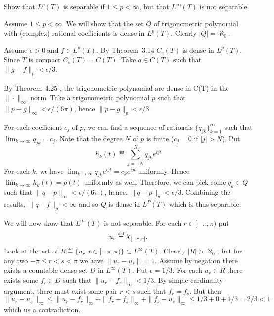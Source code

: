 \begin{enumerate}
\begin{excopy}
Show that \(L^p(T)\) is separable if \(1\leq p < \infty\),
but that \(L^\infty(T)\) is not separable.
\end{excopy}

Assume \(1\leq p < \infty\).
We will show that the set $Q$ of trigonometric polynomial
with (complex) rational coefficients is dense in \(L^p(T)\).
Clearly \(|Q| = \aleph_0\).

Assume \(\epsilon > 0\) and \(f\in L^p(T)\).
By Theorem~3.14 \cite{RudinRCA80} \(C_c(T)\) is dense in \(L^p(T)\).
Since $T$ is compact \(C_c(T)=C(T)\).
Take \(g\in C(T)\) such that \(\|g - f\|_p < \epsilon/3\).

By Theorem~4.25 \cite{RudinRCA80}, the trigonometric polynomial
are dense in C(T) in the \(\|\cdot\|_\infty\) norm.
Take a trigonometric polynomial $p$ such that
\(\|p - g\|_\infty < \epsilon/(6\pi)\), hence
\(\|p - g\|_p < \epsilon/3\).

For each coefficient \(c_j\) of $p$, we can find a sequence of
rationals \(\{q_{jk}\}_{k=1}^\infty\)
such that \(\lim_{k\to\infty} q_{jk} = c_j\).
Note that  the degree $N$ of $p$ is finite (\(c_j = 0\) if \(|j| > N\)).
Put
\begin{equation*}
h_k(t) \eqdef \sum_{j=-N}^N q_{jk} e^{ijt}
\end{equation*}
For each $k$,
we have \(\lim_{k\to\infty} q_{jk} e^{ijt} = c_k e^{ijt}\) uniformly.
Hence  \(\lim_{k\to\infty} h_k(t) = p(t)\) uniformly as well.
Therefore, we can pick some \(q_k \in Q\) such that
\(\|q - p\|_\infty < \epsilon/(6\pi)\), hence.
\(\|q - p\|_p < \epsilon/3\).
Combining the results, \(\|q - f\|_p < \infty\)
and so $Q$ is dense in \(L^P(T)\) which is thus separable.

We will now show that  \(L^\infty(T)\) is not separable.
For each \(r\in[-\pi,\pi)\) put
\begin{equation*}
 u_r \eqdef\chhi_{[-\pi,r]}.
\end{equation*}
Look at the set of \(R \eqdef \{u_r:  r\in[-\pi,\pi)\} \subset L^\infty(T)\).
Clearly \(|R| > \aleph_0\), but
for any two \(-\pi \leq r < s < \pi\) we have \(\|u_r - u_s\| = 1\).
Assume by negation there exists a countable dense set $D$ in \(L^\infty(T)\).
Put \(\epsilon = 1/3\). For each \(u_r\in R\) there exists some \(f_r\in D\)
such that \(\|u_r - f_r\|_\infty < 1/3\). By simple cardinality argument,
there must exist some pair \(r<s\) such that \(f_r = f_s\).
But then
\begin{equation*}
 \|u_r - u_s\|_\infty
 \leq \|u_r - f_r\|_\infty + \|f_r - f_s\|_\infty + \|f_s - u_s\|_\infty
 \leq 1/3 + 0 + 1/3 = 2/3 < 1
\end{equation*}
which us a contradiction.


\end{enumerate}
